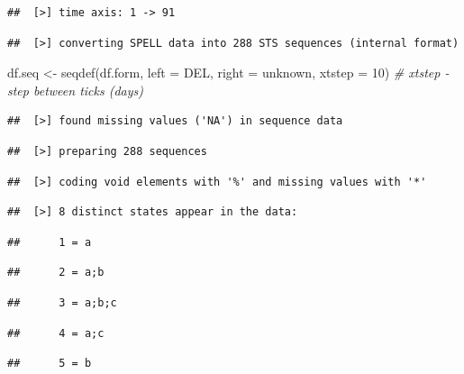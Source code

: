 \documentclass[
]{book}
\newenvironment{Shaded}{\begin{snugshade}}{\end{snugshade}}
\newcommand{\AttributeTok}[1]{\textcolor[rgb]{0.77,0.63,0.00}{#1}}
\newcommand{\CommentTok}[1]{\textcolor[rgb]{0.56,0.35,0.01}{\textit{#1}}}
\newcommand{\DecValTok}[1]{\textcolor[rgb]{0.00,0.00,0.81}{#1}}
\newcommand{\FunctionTok}[1]{\textcolor[rgb]{0.00,0.00,0.00}{#1}}
\newcommand{\NormalTok}[1]{#1}
\newcommand{\OtherTok}[1]{\textcolor[rgb]{0.56,0.35,0.01}{#1}}
\newcommand{\StringTok}[1]{\textcolor[rgb]{0.31,0.60,0.02}{#1}}
\begin{document}
\begin{verbatim}
##  [>] time axis: 1 -> 91
\end{verbatim}

\begin{verbatim}
##  [>] converting SPELL data into 288 STS sequences (internal format)
\end{verbatim}

\begin{Shaded}
\begin{Highlighting}[]
\NormalTok{df.seq }\OtherTok{\textless{}{-}}
    \FunctionTok{seqdef}\NormalTok{(df.form,}
           \AttributeTok{left =} \StringTok{\textquotesingle{}DEL\textquotesingle{}}\NormalTok{,}
           \AttributeTok{right =} \StringTok{\textquotesingle{}unknown\textquotesingle{}}\NormalTok{,}
           \AttributeTok{xtstep =} \DecValTok{10}\NormalTok{) }\CommentTok{\# xtstep {-} step between ticks (days)}
\end{Highlighting}
\end{Shaded}

\begin{verbatim}
##  [>] found missing values ('NA') in sequence data
\end{verbatim}

\begin{verbatim}
##  [>] preparing 288 sequences
\end{verbatim}

\begin{verbatim}
##  [>] coding void elements with '%' and missing values with '*'
\end{verbatim}

\begin{verbatim}
##  [>] 8 distinct states appear in the data:
\end{verbatim}

\begin{verbatim}
##      1 = a
\end{verbatim}

\begin{verbatim}
##      2 = a;b
\end{verbatim}

\begin{verbatim}
##      3 = a;b;c
\end{verbatim}

\begin{verbatim}
##      4 = a;c
\end{verbatim}

\begin{verbatim}
##      5 = b
\end{verbatim}
\end{document}
